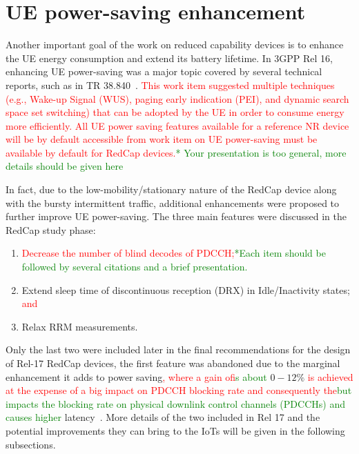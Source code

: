 \documentclass[]{IEEEtran}
\newcommand{\CAREPL}[2]{\textcolor{red}{#1}\textcolor{green}{#2}}
\begin{document}
\section{UE power-saving enhancement}
\label{sec:5-power-saving}




Another important goal of the work on reduced capability devices is to enhance the UE energy consumption and extend its battery lifetime. In 3GPP Rel 16, enhancing UE power-saving was a major topic covered by several technical reports, such as in TR 38.840~\cite{3gpp_study_2019_38.840}.  \CAREPL{This work item suggested multiple techniques (e.g.,  Wake-up Signal (WUS), paging early indication (PEI), and dynamic search space set switching) that can be adopted by the UE in order to consume energy more efficiently. All UE power saving features available for a reference NR device will be by default accessible from  work item on UE power-saving must be available by default for RedCap devices.}{* Your presentation is too general, more details should be given here}

In fact, due to the low-mobility/stationary nature of the RedCap device along with the bursty intermittent traffic, additional enhancements were proposed to further improve UE power-saving. The three main features were discussed in the RedCap study phase:
\begin{enumerate}
    \item   \CAREPL{Decrease the number of blind decodes of PDCCH;}{*Each item should be followed by several citations and a brief presentation. }
    \item   Extend sleep time of discontinuous reception (DRX) in Idle/Inactivity states; \CAREPL{and}{}
    \item   Relax RRM measurements. 
\end{enumerate}
Only the last two were included later in the final recommendations for the design of Rel-17 RedCap devices, the first feature was abandoned due to the marginal enhancement it adds to power saving\CAREPL{, where a gain of}{is about} $0-12\%$ \CAREPL{is achieved at the expense of a big impact on PDCCH blocking rate and consequently the}{but impacts the blocking rate on physical downlink control channels (PDCCHs) and causes higher} latency~\cite{ratasuk_reduced_2021}. 
More details of the two included in Rel 17 and the potential improvements they can bring to the IoTs will be given in the following subsections.
\end{document}
